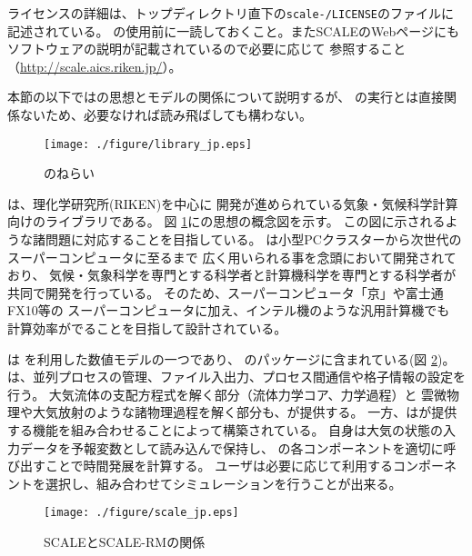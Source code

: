 ライセンスの詳細は、トップディレクトリ直下の\texttt{scale-\version/LICENSE}のファイルに記述されている。
\scalelib の使用前に一読しておくこと。またSCALEのWebページにもソフトウェアの説明が記載されているので必要に応じて
参照すること（\url{http://scale.aics.riken.jp/}）。

本節の以下では\scalelib の思想とモデルの関係について説明するが、
\scalerm の実行とは直接関係ないため、必要なければ読み飛ばしても構わない。


\begin{figure}[htb]
\begin{center}
  \texttt{[image: ./figure/library\_jp.eps]}\\
  \caption{\scalelib のねらい}
  \label{fig:scale}
\end{center}
\end{figure}

\scalelib は、理化学研究所(RIKEN)を中心に
開発が進められている気象・気候科学計算向けのライブラリである。
図 \ref{fig:scale}に\scalelib の思想の概念図を示す。
この図に示されるような諸問題に対応することを目指している。
\scalelib は小型PCクラスターから次世代のスーパーコンピュータに至るまで
広く用いられる事を念頭において開発されており、
気候・気象科学を専門とする科学者と計算機科学を専門とする科学者が
共同で開発を行っている。
そのため、スーパーコンピュータ「京」や富士通FX10等の
スーパーコンピュータに加え、インテル機のような汎用計算機でも
計算効率がでることを目指して設計されている。

\scalerm は \scalelib を利用した数値モデルの一つであり、
\scalelib のパッケージに含まれている(図 \ref{fig:scale-rm})。
\scalelib は、並列プロセスの管理、ファイル入出力、プロセス間通信や格子情報の設定を行う。
大気流体の支配方程式を解く部分（流体力学コア、力学過程）と
雲微物理や大気放射のような諸物理過程を解く部分も、\scalelib が提供する。
一方、\scalerm は\scalelib が提供する機能を組み合わせることによって構築されている。
\scalerm 自身は大気の状態の入力データを予報変数として読み込んで保持し、
\scalelib の各コンポーネントを適切に呼び出すことで時間発展を計算する。
ユーザは必要に応じて利用するコンポーネントを選択し、組み合わせてシミュレーションを行うことが出来る。

\begin{figure}[hbt]
\begin{center}
  \texttt{[image: ./figure/scale\_jp.eps]}\\
  \caption{SCALEとSCALE-RMの関係}
  \label{fig:scale-rm}
\end{center}
\end{figure}



